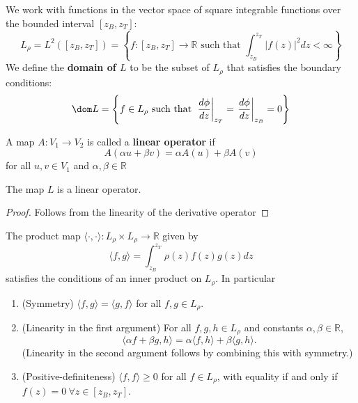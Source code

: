 %
\begin{definition}
We work with functions in the vector space of square integrable functions over the bounded interval $[z_B, z_T]$:
\begin{equation}
  L_\rho = L^2([z_B, z_T]) = \left\{ f:[z_B, z_T]\to\mathbb{R} \text{ such that } \int_{z_B}^{z_T}|f(z)|^2dz<\infty\right\}
\end{equation}
We define the \textbf{domain of $L$} to be the subset of $L_\rho$ that satisfies the boundary conditions:
\begin{equation}
  \dom L = \left\{ f\in L_\rho\text{ such that } \left.\frac{d\phi}{d z}\right|_{z_T} = \left.\frac{d\phi}{d z}\right|_{z_B} = 0\right\}
\end{equation}
\end{definition}
%
\begin{definition}
  A map $A:V_1\to V_2$ is called a \textbf{linear operator} if 
  \begin{equation}
    A(\alpha u + \beta v) = \alpha A(u) + \beta A(v)
  \end{equation}
  for all $u, v\in V_1$ and $\alpha, \beta\in\mathbb{R}$
\end{definition}
%
\begin{proposition}
  The map $L$ is a linear operator. 
\end{proposition}
\begin{proof}
  Follows from the linearity of the derivative operator
\end{proof}
%
\begin{proposition}
  \label{propA:inner_product}
  The product  map $\langle\cdot,\cdot\rangle: L_\rho\times L_\rho \to \mathbb{R}$ given by 
\begin{equation}
  \label{eqA:inner_product_definition}
  \langle f, g\rangle = \int_{z_B}^{z_T}\rho(z)f(z)g(z)dz 
\end{equation}
satisfies the conditions of an inner product on $L_\rho$. In particular
  \begin{enumerate}[label=(\alph*)]
  \item (Symmetry) $\langle f, g\rangle = \langle g, f\rangle$ for all $f, g \in L_\rho$.
  \item (Linearity in the first argument) For all $f, g, h \in L_\rho$ and constants $\alpha, \beta \in \mathbb{R}$,
  \begin{equation}
    \langle \alpha f + \beta g, h\rangle = \alpha \langle f, h\rangle + \beta \langle g, h\rangle.
  \end{equation}
  (Linearity in the second argument follows by combining this with symmetry.)
  \item (Positive-definiteness) $\langle f, f\rangle \geq 0$ for all $f \in L_\rho$, with equality if and only if $f (z) = 0\ \forall z\in[z_B, z_T]$.
\end{enumerate}
\end{proposition}
